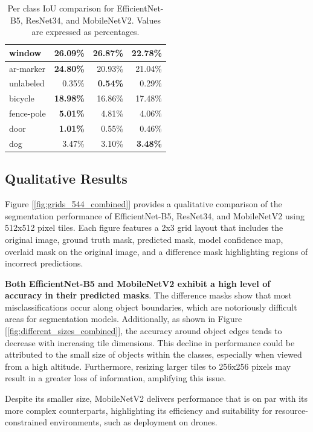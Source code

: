 \documentclass[a4paper]{article}
\begin{document}
\begin{table}[htbp]
\begin{tabular}{|l|r|r|r|}
    window         & 26.09\% & \textbf{26.87}\% & 22.78\% \\ \hline
    ar-marker      & \textbf{24.80\%} & 20.93\% & 21.04\% \\ \hline
    unlabeled      & 0.35\%  & \textbf{0.54\%}  & 0.29\%  \\ \hline
    bicycle        & \textbf{18.98\%} & 16.86\% & 17.48\% \\ \hline
    fence-pole     & \textbf{5.01\%}  & 4.81\%  & 4.06\%  \\ \hline
    door           & \textbf{1.01\%}  & 0.55\%  & 0.46\%  \\ \hline
    dog            & 3.47\%  & 3.10\%  & \textbf{3.48\%}  \\ \hline
    \end{tabular}
    \caption{Per class IoU comparison for EfficientNet-B5, ResNet34, and MobileNetV2. Values are expressed as percentages.}
    \label{table:per_class_iou}
\end{table}

\subsection{Qualitative Results}

Figure [\ref{fig:grids_544_combined}] provides a qualitative comparison of the segmentation performance of EfficientNet-B5, ResNet34, and MobileNetV2 using 512x512 pixel tiles. Each figure features a 2x3 grid layout that includes the original image, ground truth mask, predicted mask, model confidence map, overlaid mask on the original image, and a difference mask highlighting regions of incorrect predictions.

\textbf{Both EfficientNet-B5 and MobileNetV2 exhibit a high level of accuracy in their predicted masks}. The difference masks show that most misclassifications occur along object boundaries, which are notoriously difficult areas for segmentation models. Additionally, as shown in Figure [\ref{fig:different_sizes_combined}], the accuracy around object edges tends to decrease with increasing tile dimensions. This decline in performance could be attributed to the small size of objects within the classes, especially when viewed from a high altitude. Furthermore, resizing larger tiles to 256x256 pixels may result in a greater loss of information, amplifying this issue.

Despite its smaller size, MobileNetV2 delivers performance that is on par with its more complex counterparts, highlighting its efficiency and suitability for resource-constrained environments, such as deployment on drones.
\end{document}
